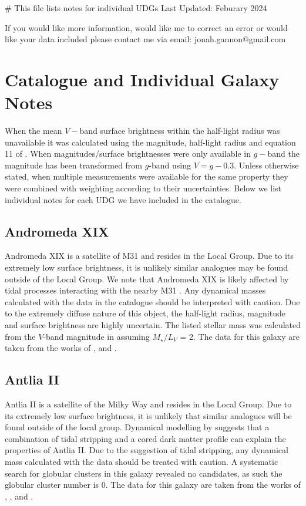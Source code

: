 # This file lists notes for individual UDGs 
Last Updated: Feburary 2024

If you would like more information, would like me to correct an error or would like your data included please contact me via email:
jonah.gannon@gmail.com

\section{Catalogue and Individual Galaxy Notes} \label{sec:catalogue}
When the mean $V-$band surface brightness within the half-light radius was unavailable it was calculated using the magnitude, half-light radius and equation 11 of \citet{Graham2005}.  When magnitudes/surface brightnesses were only available in $g-$band the magnitude has been transformed from $g$-band using $V=g-0.3$. Unless otherwise stated, when multiple measurements were available for the same property they were combined with weighting according to their uncertainties. Below we list individual notes for each UDG we have included in the catalogue.

\subsection{Andromeda XIX}
Andromeda XIX is a satellite of M31 and resides in the Local Group. Due to its extremely low surface brightness, it is unlikely similar analogues may be found outside of the Local Group. We note that Andromeda XIX is likely affected by tidal processes interacting with the nearby M31 \citep{Collins2020, Collins2022}. Any dynamical masses calculated with the data in the catalogue should be interpreted with caution. Due to the extremely diffuse nature of this object, the half-light radius, magnitude and surface brightness are highly uncertain. The listed stellar mass was calculated from the $V$-band magnitude in \citet{Martin2016} assuming $M_{\star}/L_{V}$ = 2. The data for this galaxy are taken from the works of \citet{Martin2016}, \citet{Collins2020} and \citet{Gannon2021}.

\subsection{Antlia II}
Antlia II is a satellite of the Milky Way and resides in the Local Group. Due to its extremely low surface brightness, it is unlikely that similar analogues will be found outside of the local group. Dynamical modelling by \citet{torrealba2019} suggests that a combination of tidal stripping and a cored dark matter profile can explain the properties of Antlia II. Due to the suggestion of tidal stripping, any dynamical mass calculated with the data should be treated with caution. A systematic search for globular clusters in this galaxy revealed no candidates, as such the globular cluster number is 0. The data for this galaxy are taken from the works of \citet{mcconnachie2012}, \citet{torrealba2019}, \citet{Ji2021} and \citet{Huang2021}.

